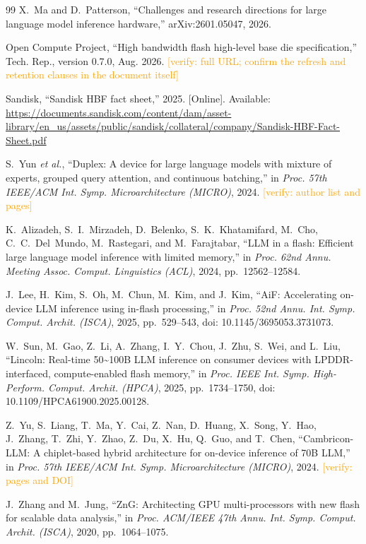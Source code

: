 \documentclass[conference,10pt]{IEEEtran}
\newcommand{\verify}[1]{\textcolor{orange}{[verify: #1]}}
\begin{document}
\begin{thebibliography}{99}
X.~Ma and D.~Patterson, ``Challenges and research directions for large
language model inference hardware,'' arXiv:2601.05047, 2026.

Open Compute Project, ``High bandwidth flash high-level base die
specification,'' Tech. Rep., version 0.7.0, Aug. 2026. \verify{full URL; confirm
the refresh and retention clauses in the document itself}

Sandisk, ``Sandisk {HBF} fact sheet,'' 2025. [Online]. Available:
\url{https://documents.sandisk.com/content/dam/asset-library/en_us/assets/public/sandisk/collateral/company/Sandisk-HBF-Fact-Sheet.pdf}

S.~Yun \emph{et al.}, ``Duplex: A device for large language models with mixture
of experts, grouped query attention, and continuous batching,'' in \emph{Proc.
57th IEEE/ACM Int. Symp. Microarchitecture (MICRO)}, 2024.
\verify{author list and pages}

K.~Alizadeh, S.~I.~Mirzadeh, D.~Belenko, S.~K.~Khatamifard, M.~Cho,
C.~C.~Del~Mundo, M.~Rastegari, and M.~Farajtabar, ``{LLM} in a flash: Efficient
large language model inference with limited memory,'' in \emph{Proc. 62nd
Annu. Meeting Assoc. Comput. Linguistics (ACL)}, 2024, pp.~12562--12584.

J.~Lee, H.~Kim, S.~Oh, M.~Chun, M.~Kim, and J.~Kim, ``{AiF}: Accelerating
on-device {LLM} inference using in-flash processing,'' in \emph{Proc. 52nd
Annu. Int. Symp. Comput. Archit. (ISCA)}, 2025, pp.~529--543,
doi: 10.1145/3695053.3731073.

W.~Sun, M.~Gao, Z.~Li, A.~Zhang, I.~Y.~Chou, J.~Zhu, S.~Wei, and L.~Liu,
``Lincoln: Real-time 50\textasciitilde100{B} {LLM} inference on consumer
devices with {LPDDR}-interfaced, compute-enabled flash memory,'' in \emph{Proc.
IEEE Int. Symp. High-Perform. Comput. Archit. (HPCA)}, 2025, pp.~1734--1750,
doi: 10.1109/HPCA61900.2025.00128.

Z.~Yu, S.~Liang, T.~Ma, Y.~Cai, Z.~Nan, D.~Huang, X.~Song, Y.~Hao, J.~Zhang,
T.~Zhi, Y.~Zhao, Z.~Du, X.~Hu, Q.~Guo, and T.~Chen, ``{Cambricon-LLM}: A
chiplet-based hybrid architecture for on-device inference of 70{B} {LLM},'' in
\emph{Proc. 57th IEEE/ACM Int. Symp. Microarchitecture (MICRO)}, 2024.
\verify{pages and DOI}

J.~Zhang and M.~Jung, ``{ZnG}: Architecting {GPU} multi-processors with new
flash for scalable data analysis,'' in \emph{Proc. ACM/IEEE 47th Annu. Int.
Symp. Comput. Archit. (ISCA)}, 2020, pp.~1064--1075.


\end{thebibliography}
\end{document}

